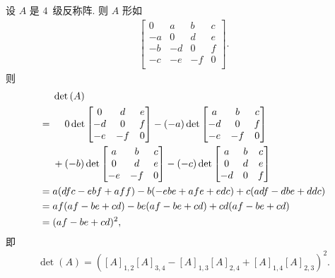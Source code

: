 \begin{example}
    设 \(A\) 是 \(4\)~级反称阵.
    则 \(A\) 形如
    \begin{align*}
        \begin{bmatrix}
            0  & a  & b  & c \\
            -a & 0  & d  & e \\
            -b & -d & 0  & f \\
            -c & -e & -f & 0 \\
        \end{bmatrix}.
    \end{align*}
    则
    \begin{align*}
             & \det {(A)}
        \\
        = {} &
        \hphantom{{} + {}}
        0
        \det {\begin{bmatrix}
                      0  & d  & e \\
                      -d & 0  & f \\
                      -e & -f & 0 \\
                  \end{bmatrix}}
        - (-a)
        \det {\begin{bmatrix}
                      a  & b  & c \\
                      -d & 0  & f \\
                      -e & -f & 0 \\
                  \end{bmatrix}}
        \\
             &
        + (-b)
        \det {\begin{bmatrix}
                      a  & b  & c \\
                      0  & d  & e \\
                      -e & -f & 0 \\
                  \end{bmatrix}}
        - (-c)
        \det {\begin{bmatrix}
                      a  & b & c \\
                      0  & d & e \\
                      -d & 0 & f \\
                  \end{bmatrix}}
        \\
        = {} &
        a (dfc - ebf + aff)
        - b (-ebe + afe + edc)
        + c (adf - dbe + ddc)
        \\
        = {} &
        af (af - be + cd)
        - be (af - be + cd)
        + cd (af - be + cd)
        \\
        = {} & (af - be + cd)^2,
    \end{align*}
    即
    \begin{align*}
        \det {(A)}
        = ([A]_{1,2} [A]_{3,4} - [A]_{1,3} [A]_{2,4}
        + [A]_{1,4} [A]_{2,3})^2.
    \end{align*}
\end{example}

